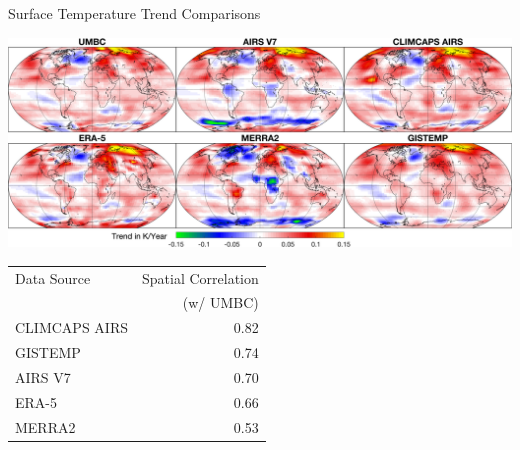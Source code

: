 \documentclass[10pt,t]{beamer}
\begin{document}
\begin{frame}{Surface Temperature Trend Comparisons}
\vspace{-0.15in}
\begin{center}
\includegraphics[width=\linewidth]{SunClimate2022/tsurf_maps_6sources_giss.png}
\end{center}

\vspace{0.1in}
\footnotesize
\begin{center}
\begin{tabular}{lr}
\hline
Data Source & Spatial Correlation\\
 & (w/ UMBC)\\
\hline
CLIMCAPS AIRS & 0.82\\
GISTEMP & 0.74\\
AIRS V7 & 0.70\\
ERA-5 & 0.66\\
MERRA2 & 0.53\\
\hline
\end{tabular}
\end{center}
\end{frame}
\end{document}
